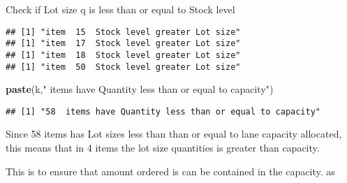 \documentclass[
]{article}
\newenvironment{Shaded}{\begin{snugshade}}{\end{snugshade}}
\newcommand{\ControlFlowTok}[1]{\textcolor[rgb]{0.13,0.29,0.53}{\textbf{#1}}}
\newcommand{\DecValTok}[1]{\textcolor[rgb]{0.00,0.00,0.81}{#1}}
\newcommand{\KeywordTok}[1]{\textcolor[rgb]{0.13,0.29,0.53}{\textbf{#1}}}
\newcommand{\NormalTok}[1]{#1}
\newcommand{\OperatorTok}[1]{\textcolor[rgb]{0.81,0.36,0.00}{\textbf{#1}}}
\newcommand{\StringTok}[1]{\textcolor[rgb]{0.31,0.60,0.02}{#1}}
\begin{document}
Check if Lot size q is less than or equal to Stock level

\begin{Shaded}
\end{Shaded}

\begin{verbatim}
## [1] "item  15  Stock level greater Lot size"
## [1] "item  17  Stock level greater Lot size"
## [1] "item  18  Stock level greater Lot size"
## [1] "item  50  Stock level greater Lot size"
\end{verbatim}

\begin{Shaded}
\begin{Highlighting}[]
\KeywordTok{paste}\NormalTok{(k,}\StringTok{" items have Quantity less than or equal to capacity"}\NormalTok{)}
\end{Highlighting}
\end{Shaded}

\begin{verbatim}
## [1] "58  items have Quantity less than or equal to capacity"
\end{verbatim}

Since 58 items has Lot sizes less than than or equal to lane capacity
allocated, this means that in 4 items the lot size quantities is greater
than capacity.

This is to ensure that amount ordered is can be contained in the
capacity. as
\end{document}
